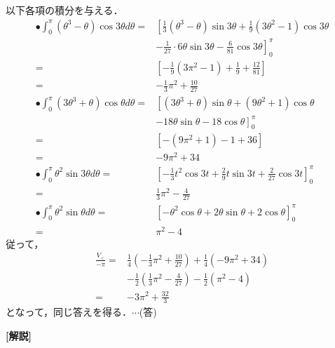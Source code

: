 \documentclass[a4paper,10pt]{ltjsarticle}
\begin{document}
\begin{multicols}{2}
  以下各項の積分を与える．
  \begin{align*}
    \bullet \int_0^\pi (\theta^3-\theta) \cos 3\theta d\theta
    = & \left[ \frac{1}{3}(\theta^3-\theta) \sin 3\theta + \frac{1}{9}(3\theta^2-1) \cos 3\theta \right. \\
      & \left. - \frac{1}{27} \cdot 6\theta \sin 3\theta- \frac{6}{81} \cos 3\theta \right]_0^\pi        \\
    = & \left[ -\frac{1}{9}(3\pi^2-1) + \frac{1}{9}+\frac{12}{81} \right]                                \\
    = & -\frac{1}{3}\pi^2 + \frac{10}{27}                                                                \\
    \bullet \int_0^\pi (3\theta^3+\theta) \cos\theta d\theta
    = & \left[ (3\theta^3+\theta) \sin\theta + (9\theta^2+1) \cos\theta \right.                          \\
      & \left. - 18\theta\sin\theta - 18\cos\theta \right]_0^\pi                                         \\
    = & [-(9\pi^2+1) - 1 + 36]                                                                           \\
    = & -9\pi^2 + 34                                                                                     \\
    \bullet \int_0^\pi \theta^2 \sin 3\theta d\theta
    = & \left[ -\frac{1}{3}t^2 \cos 3t + \frac{2}{9}t \sin 3t + \frac{2}{27} \cos 3t \right]_0^\pi       \\
    = & \frac{1}{3}\pi^2 - \frac{4}{27}                                                                  \\
    \bullet \int_0^\pi \theta^2 \sin \theta d\theta
    = & \left[ - \theta^2 \cos \theta + 2 \theta \sin \theta + 2\cos \theta \right]_0^\pi                \\
    = & \pi^2 -4
  \end{align*}
  従って，
  \begin{align*}
    \frac{V_{<}}{-\pi}
    = & \frac{1}{4}\left(-\frac{1}{3}\pi^2 + \frac{10}{27}\right) + \frac{1}{4}(-9\pi^2+34)          \\
      & - \frac{1}{2}\left(\frac{1}{3}\pi^2 - \frac{4}{27}\right) - \frac{1}{2}\left(\pi^2 -4\right) \\
    = & -3\pi^2 + \frac{32}{3}
  \end{align*}
  となって，同じ答えを得る．$\cdots$(答)

  \vspace{10pt}
  {\bf[解説]}


  \newpage
\end{multicols}
\end{document}
